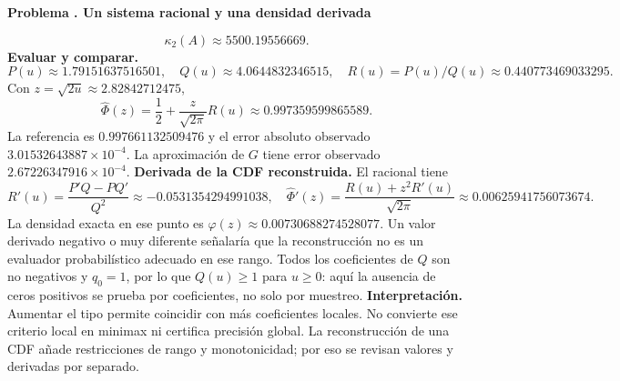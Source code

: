 \documentclass[11pt,a4paper]{article}
\theoremstyle{definition}
\newcounter{problema}
\newenvironment{resuelto}[1]{\refstepcounter{problema}\par\medskip\Needspace{6\baselineskip}\textbf{Problema \theproblema. #1}\par}{\par\medskip}
\begin{document}
\begin{resuelto}{Un sistema racional y una densidad derivada}
\[\kappa_2(A)\approx5500.19556669.
\]
\textbf{Evaluar y comparar.}
\[
P(u)\approx1.79151637516501,\quad Q(u)\approx4.0644832346515,\quad R(u)=P(u)/Q(u)\approx0.440773469033295.
\]
Con $z=\sqrt{2u}\approx2.82842712475$,
\[
\widehat\Phi(z)=\frac12+\frac z{\sqrt{2\pi}}R(u)\approx0.997359599865589.
\]
La referencia es $0.997661132509476$ y el error absoluto observado $3.01532643887\times10^{-4}$. La aproximación de $G$ tiene error observado $2.67226347916\times10^{-4}$.
\textbf{Derivada de la CDF reconstruida.} El racional tiene
\[
R\prime(u)=\frac{P\prime Q-PQ\prime}{Q^2}\approx-0.0531354294991038,\quad
\widehat\Phi\prime(z)=\frac{R(u)+z^2R\prime(u)}{\sqrt{2\pi}}\approx0.00625941756073674.
\]
La densidad exacta en ese punto es $\varphi(z)\approx0.00730688274528077$. Un valor derivado negativo o muy diferente señalaría que la reconstrucción no es un evaluador probabilístico adecuado en ese rango.
Todos los coeficientes de $Q$ son no negativos y $q_0=1$, por lo que $Q(u)\ge1$ para $u\ge0$: aquí la ausencia de ceros positivos se prueba por coeficientes, no solo por muestreo.
\textbf{Interpretación.} Aumentar el tipo permite coincidir con más coeficientes locales. No convierte ese criterio local en minimax ni certifica precisión global. La reconstrucción de una CDF añade restricciones de rango y monotonicidad; por eso se revisan valores y derivadas por separado.
\end{resuelto}
\end{document}
